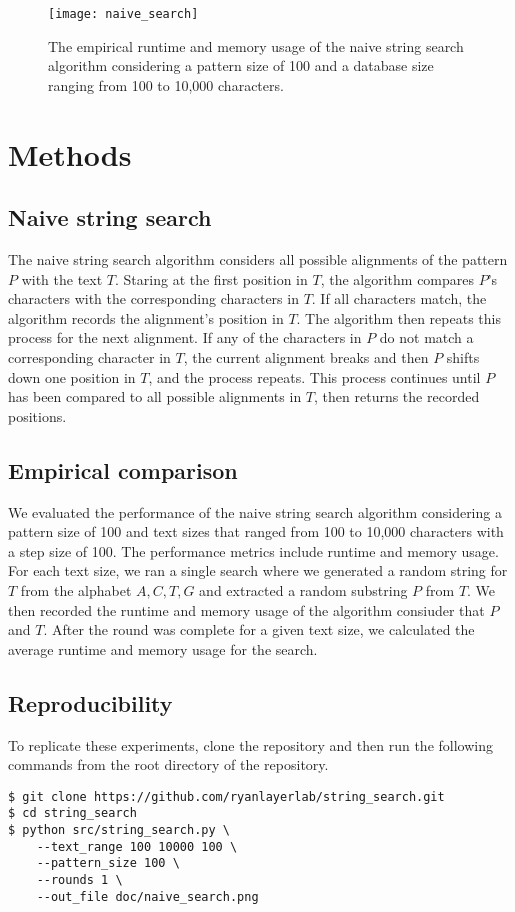 \documentclass[11pt, letterpaper]{article}
\begin{document}

\begin{figure}[ht] \centering
    \texttt{[image: naive\_search]}
    \caption{The empirical runtime and memory usage of the naive string search
    algorithm considering a pattern size of 100 and a database size ranging
    from 100 to 10,000 characters.}
    \label{timeandmem}
\end{figure}


\section{Methods}

\subsection{Naive string search}
The naive string search algorithm considers all possible alignments of the
pattern $P$ with the text $T$. Staring at the first position in $T$, the
algorithm compares $P$'s characters with the corresponding characters in $T$.
If all characters match, the algorithm records the alignment's position in $T$.
The algorithm then repeats this process for the next alignment. If any of the 
characters in $P$ do not match a corresponding character in $T$, the current
alignment breaks and then $P$ shifts down one position in $T$, and the process
repeats. This process continues until $P$ has been compared to all possible
alignments in $T$, then returns the recorded positions.

\subsection{Empirical comparison}

We evaluated the performance of the naive string search algorithm considering a
pattern size of 100 and text sizes that ranged from 100 to 10,000 characters
with a step size of 100.  The performance metrics include runtime and memory
usage. For each text size, we ran a single search where we generated a random
string for $T$ from the alphabet ${A, C, T, G}$ and extracted a random
substring $P$ from $T$. We then recorded the runtime and memory usage of the
algorithm consiuder that $P$ and $T$. After the round was complete for a given
text size, we calculated the average runtime and memory usage for the search.

\subsection{Reproducibility}
To replicate these experiments, clone the repository and then run the
following commands from the root directory of the repository.
\begin{verbatim}
$ git clone https://github.com/ryanlayerlab/string_search.git
$ cd string_search
$ python src/string_search.py \
    --text_range 100 10000 100 \
    --pattern_size 100 \
    --rounds 1 \
    --out_file doc/naive_search.png
\end{verbatim}
\end{document}
